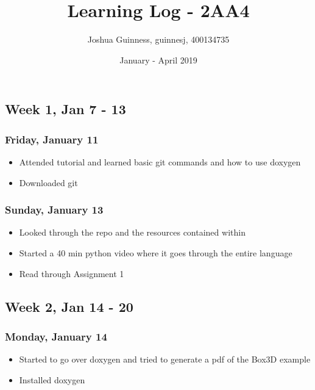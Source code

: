\documentclass{article}
\title{Learning Log - 2AA4}
\author{Joshua Guinness, guinnesj, 400134735}
\date{January - April 2019}
\begin{document}
\maketitle

\subsection{Week 1, Jan 7 - 13}

\subsubsection{Friday, January 11}
\begin{itemize}
    \item Attended tutorial and learned basic git commands and how to use doxygen
    \item Downloaded git
\end{itemize}

\subsubsection{Sunday, January 13}
\begin{itemize}
    \item Looked through the repo and the resources contained within
    \item Started a 40 min python video where it goes through the entire language
    \item Read through Assignment 1
\end{itemize}

\subsection{Week 2, Jan 14 - 20}

\subsubsection{Monday, January 14}
\begin{itemize}
    \item Started to go over doxygen and tried to generate a pdf of the Box3D example
    \item Installed doxygen
\end{itemize}
\end{document}
